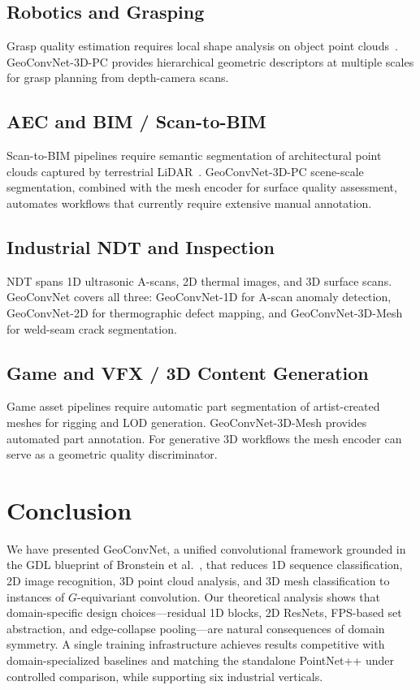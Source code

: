 \documentclass[10pt,conference]{IEEEtran}
\begin{document}
\subsection{Robotics and Grasping}

Grasp quality estimation requires local shape analysis on object point
clouds~\cite{qi2018frustum}. GeoConvNet-3D-PC provides hierarchical
geometric descriptors at multiple scales for grasp planning from
depth-camera scans.

\subsection{AEC and BIM / Scan-to-BIM}

Scan-to-BIM pipelines require semantic segmentation of architectural point
clouds captured by terrestrial LiDAR~\cite{armeni2016semanticS3DIS}.
GeoConvNet-3D-PC scene-scale segmentation, combined with the mesh encoder
for surface quality assessment, automates workflows that currently require
extensive manual annotation.

\subsection{Industrial NDT and Inspection}

NDT spans 1D ultrasonic A-scans, 2D thermal images, and 3D surface scans.
GeoConvNet covers all three: GeoConvNet-1D for A-scan anomaly detection,
GeoConvNet-2D for thermographic defect mapping, and GeoConvNet-3D-Mesh for
weld-seam crack segmentation.

\subsection{Game and VFX / 3D Content Generation}

Game asset pipelines require automatic part segmentation of artist-created
meshes for rigging and LOD generation. GeoConvNet-3D-Mesh provides
automated part annotation. For generative 3D workflows the mesh encoder
can serve as a geometric quality discriminator.

\section{Conclusion}
\label{sec:conclusion}

We have presented GeoConvNet, a unified convolutional framework grounded in
the GDL blueprint of Bronstein et al.~\cite{bronstein2021geometric}, that
reduces 1D sequence classification, 2D image recognition, 3D point cloud
analysis, and 3D mesh classification to instances of $G$-equivariant
convolution. Our theoretical analysis shows that domain-specific design
choices---residual 1D blocks, 2D ResNets, FPS-based set abstraction, and
edge-collapse pooling---are natural consequences of domain symmetry. A
single training infrastructure achieves results competitive with
domain-specialized baselines and matching the standalone PointNet++ under
controlled comparison, while supporting six industrial verticals.
\end{document}
